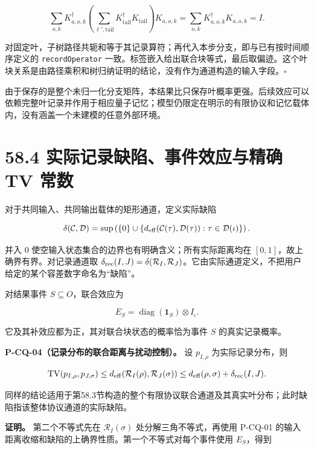\documentclass[
  11pt,
  oneside]{book}
\begin{document}
\[
\sum_{o,k}K_{a,o,k}^\dagger
\left(\sum_{\ell',\text{tail}}K_{\text{tail}}^\dagger K_{\text{tail}}\right)
K_{a,o,k}
=\sum_{o,k}K_{a,o,k}^\dagger K_{a,o,k}=I.
\]

对固定叶，子树路径共轭和等于其记录算符；再代入本步分支，即与已有按时间顺序定义的
\texttt{recordOperator}
一致。标签嵌入给出联合块等式，最后取偏迹。这个叶块关系是由路径乘积和树归纳证明的结论，没有作为通道构造的输入字段。\(\square\)

由于保存的是整个未归一化分支矩阵，本结果比只保存叶概率更强。后续效应可以依赖完整叶记录并作用于相应量子记忆；模型仍限定在明示的有限协议和记忆载体内，没有涵盖一个未建模的任意外部环境。

\hypertarget{ux5b9eux9645ux8bb0ux5f55ux7f3aux9677ux4e8bux4ef6ux6548ux5e94ux4e0eux7cbeux786e-tv-ux5e38ux6570}{%
\section{58.4 实际记录缺陷、事件效应与精确 TV
常数}\label{ux5b9eux9645ux8bb0ux5f55ux7f3aux9677ux4e8bux4ef6ux6548ux5e94ux4e0eux7cbeux786e-tv-ux5e38ux6570}}

对于共同输入、共同输出载体的矩形通道，定义实际缺陷

\[
\delta(\mathcal C,\mathcal D)=
\sup\left(\{0\}\cup\{d_{\rm eff}(\mathcal C(\tau),\mathcal D(\tau)):
\tau\in\mathcal D(\iota)\}\right).
\]

并入 \(0\) 使空输入状态集合的边界也有明确含义；所有实际距离均在
\([0,1]\)，故上确界有界。对记录通道取
\(\delta_{\rm rec}(I,J)=\delta(\mathcal R_I,\mathcal R_J)\)。它由实际通道定义，不把用户给定的某个容差数字命名为``缺陷''。

对结果事件 \(S\subseteq O\)，联合效应为

\[
E_S=\operatorname{diag}(\mathbf1_S)\otimes I_\iota.
\]

它及其补效应都为正，其对联合块状态的概率恰为事件 \(S\) 的真实记录概率。

\protect\hypertarget{p-cq-04}{}{}

\textbf{P-CQ-04（记录分布的联合距离与扰动控制）。} 设 \(p_{I,\rho}\)
为实际记录分布，则

\[
\operatorname{TV}(p_{I,\rho},p_{J,\sigma})
\le d_{\rm eff}(\mathcal R_I(\rho),\mathcal R_J(\sigma))
\le d_{\rm eff}(\rho,\sigma)+\delta_{\rm rec}(I,J).
\]

同样的结论适用于第58.3节构造的整个有限协议联合通道及其真实叶分布；此时缺陷指该整体协议通道的实际缺陷。

\textbf{证明。} 第二个不等式先在 \(\mathcal R_I(\sigma)\)
处分解三角不等式，再使用 P-CQ-01
的输入距离收缩和缺陷的上确界性质。第一个不等式对每个事件使用
\(E_S\)，得到
\end{document}
